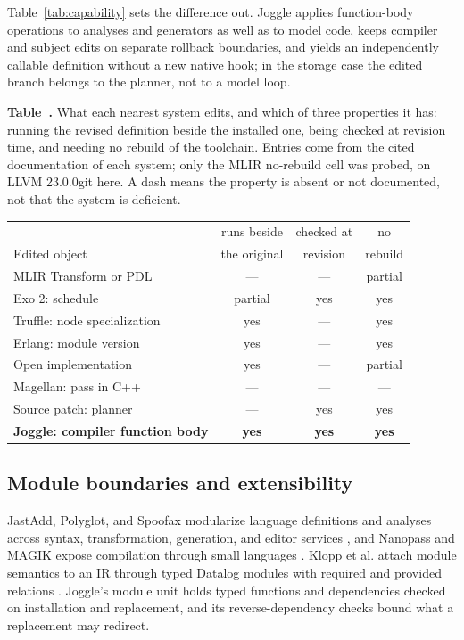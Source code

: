 \documentclass[sigplan,anonymous,review]{acmart}
\begin{document}
Table~\ref{tab:capability} sets the difference out. Joggle applies
function-body operations to analyses and generators as well as to model code,
keeps compiler and subject edits on separate rollback boundaries, and yields an
independently callable definition without a new native hook; in the storage case
the edited branch belongs to the planner, not to a model loop.

\begin{center}
\small
{}\label{tab:capability}
\textbf{Table~\thetable.} What each nearest system edits, and which of three
properties it has: running the revised definition beside the installed one,
being checked at revision time, and needing no rebuild of the toolchain. Entries
come from the cited documentation of each system; only the MLIR no-rebuild cell was probed, on
LLVM 23.0.0git here. A dash means the property is absent or not documented, not
that the system is deficient.

\vspace{2pt}
{\footnotesize
\begin{tabular}{@{}lccc@{}}
\toprule
 & runs beside & checked at & no \\
Edited object & the original & revision & rebuild \\
\midrule
MLIR Transform or PDL \cite{lucke2025transform,mlirPdl} & --- & --- & partial \\
Exo 2: schedule \cite{ikarashi2024exo2} & partial & yes & yes \\
Truffle: node specialization \cite{wurthinger2017practical} & yes & --- & yes \\
Erlang: module version \cite{erlangCodeLoading,hicks2005dynamic} & yes & --- & yes \\
Open implementation \cite{lamping1992open,kiczales1997open,chiba1995mop} & yes & --- & partial \\
Magellan: pass in C++ \cite{chen2026magellan} & --- & --- & --- \\
Source patch: planner & --- & yes & yes \\
\textbf{Joggle: compiler function body} & \textbf{yes} & \textbf{yes} & \textbf{yes} \\
\bottomrule
\end{tabular}}
\end{center}

\subsection{Module boundaries and extensibility}
JastAdd, Polyglot, and Spoofax modularize language definitions and analyses
across syntax, transformation, generation, and editor services
\cite{ekman2007jastadd,nystrom2003polyglot,kats2010spoofax}, and Nanopass and
MAGIK expose compilation through small languages
\cite{sarkar2005nanopass,engler1997magik}. Klopp et al. attach module semantics
to an IR through typed Datalog modules with required and provided relations
\cite{klopp2024datalogmodules}. Joggle's module unit holds typed functions and
dependencies checked on installation and replacement, and its reverse-dependency
checks bound what a replacement may redirect.
\end{document}
